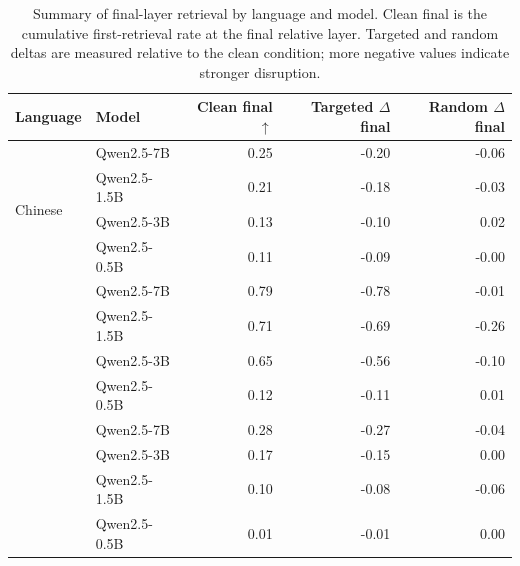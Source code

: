 \begin{table}[t]
\centering
\small
\begin{tabular}{llrrr}
\toprule
\textbf{Language} & \textbf{Model} & \textbf{Clean final $\uparrow$} & \textbf{Targeted $\Delta$ final} & \textbf{Random $\Delta$ final} \\
\midrule
\multirow{4}{*}{Chinese} & Qwen2.5-7B & 0.25 & -0.20 & -0.06 \\
 & Qwen2.5-1.5B & 0.21 & -0.18 & -0.03 \\
 & Qwen2.5-3B & 0.13 & -0.10 & 0.02 \\
 & Qwen2.5-0.5B & 0.11 & -0.09 & -0.00 \\
\addlinespace
\multirow{4}{*}{English} & Qwen2.5-7B & 0.79 & -0.78 & -0.01 \\
 & Qwen2.5-1.5B & 0.71 & -0.69 & -0.26 \\
 & Qwen2.5-3B & 0.65 & -0.56 & -0.10 \\
 & Qwen2.5-0.5B & 0.12 & -0.11 & 0.01 \\
\addlinespace
\multirow{4}{*}{Turkish} & Qwen2.5-7B & 0.28 & -0.27 & -0.04 \\
 & Qwen2.5-3B & 0.17 & -0.15 & 0.00 \\
 & Qwen2.5-1.5B & 0.10 & -0.08 & -0.06 \\
 & Qwen2.5-0.5B & 0.01 & -0.01 & 0.00 \\
\bottomrule
\end{tabular}
\caption{Summary of final-layer retrieval by language and model. Clean final is the cumulative first-retrieval rate at the final relative layer. Targeted and random deltas are measured relative to the clean condition; more negative values indicate stronger disruption.}
\label{tab:qwen_layerwise_summary}
\end{table}

